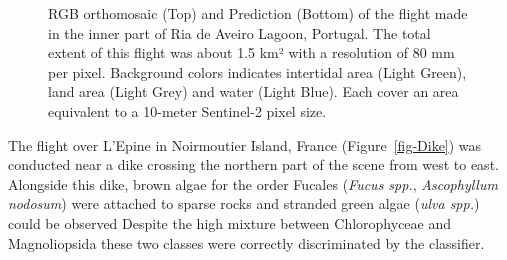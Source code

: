 \documentclass[
  number]{elsarticle}
\begin{document}
\label{cell-fig-Boat}
\begin{figure}[H]


\caption{\label{fig-Boat}RGB orthomosaic (Top) and Prediction (Bottom)
of the flight made in the inner part of Ria de Aveiro Lagoon, Portugal.
The total extent of this flight was about 1.5 km² with a resolution of
80 mm per pixel. Background colors indicates intertidal area (Light
Green), land area (Light Grey) and water (Light Blue). Each cover an
area equivalent to a 10-meter Sentinel-2 pixel size.}

\end{figure}%

The flight over L'Epine in Noirmoutier Island, France
(Figure~\ref{fig-Dike}) was conducted near a dike crossing the northern
part of the scene from west to east. Alongside this dike, brown algae
for the order Fucales (\emph{Fucus spp.}, \emph{Ascophyllum nodosum})
were attached to sparse rocks and stranded green algae (\emph{ulva
spp.}) could be observed Despite the high mixture between Chlorophyceae
and Magnoliopsida these two classes were correctly discriminated by the
classifier.
\end{document}
